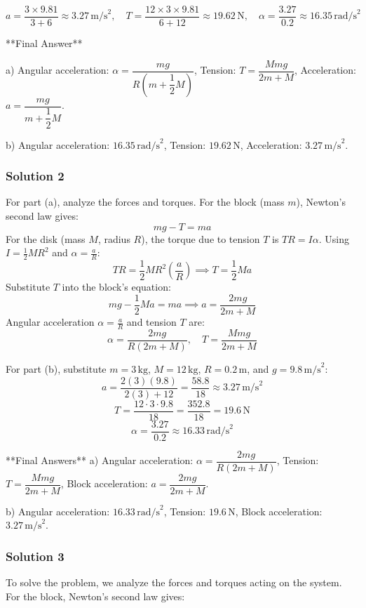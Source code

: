 \documentclass{article}
\begin{document}
\[
a = \frac{3 \times 9.81}{3 + 6} \approx 3.27\,\text{m/s}^2, \quad T = \frac{12 \times 3 \times 9.81}{6 + 12} \approx 19.62\,\text{N}, \quad \alpha = \frac{3.27}{0.2} \approx 16.35\,\text{rad/s}^2
\]

**Final Answer**

a) Angular acceleration: $\boxed{\alpha = \dfrac{mg}{R\left(m + \dfrac{1}{2}M\right)}}$,  
Tension: $\boxed{T = \dfrac{Mmg}{2m + M}}$,  
Acceleration: $\boxed{a = \dfrac{mg}{m + \dfrac{1}{2}M}}$.

b) Angular acceleration: $\boxed{16.35\,\text{rad/s}^2}$,  
Tension: $\boxed{19.62\,\text{N}}$,  
Acceleration: $\boxed{3.27\,\text{m/s}^2}$.

\subsubsection{Solution 2}

For part (a), analyze the forces and torques. For the block (mass $m$), Newton's second law gives:
\[
mg - T = ma
\]
For the disk (mass $M$, radius $R$), the torque due to tension $T$ is $TR = I\alpha$. Using $I = \frac{1}{2}MR^2$ and $\alpha = \frac{a}{R}$:
\[
TR = \frac{1}{2}MR^2 \left(\frac{a}{R}\right) \implies T = \frac{1}{2}Ma
\]
Substitute $T$ into the block's equation:
\[
mg - \frac{1}{2}Ma = ma \implies a = \frac{2mg}{2m + M}
\]
Angular acceleration $\alpha = \frac{a}{R}$ and tension $T$ are:
\[
\alpha = \frac{2mg}{R(2m + M)}, \quad T = \frac{Mmg}{2m + M}
\]

For part (b), substitute $m = 3\,\text{kg}$, $M = 12\,\text{kg}$, $R = 0.2\,\text{m}$, and $g = 9.8\,\text{m/s}^2$:
\[
a = \frac{2(3)(9.8)}{2(3) + 12} = \frac{58.8}{18} \approx 3.27\,\text{m/s}^2
\]
\[
T = \frac{12 \cdot 3 \cdot 9.8}{18} = \frac{352.8}{18} = 19.6\,\text{N}
\]
\[
\alpha = \frac{3.27}{0.2} \approx 16.33\,\text{rad/s}^2
\]

**Final Answers**  
a) Angular acceleration: $\boxed{\alpha = \dfrac{2mg}{R(2m + M)}}$,  
Tension: $\boxed{T = \dfrac{Mmg}{2m + M}}$,  
Block acceleration: $\boxed{a = \dfrac{2mg}{2m + M}}$.  

b) Angular acceleration: $\boxed{16.33\,\text{rad/s}^2}$,  
Tension: $\boxed{19.6\,\text{N}}$,  
Block acceleration: $\boxed{3.27\,\text{m/s}^2}$.

\subsubsection{Solution 3}
To solve the problem, we analyze the forces and torques acting on the system. For the block, Newton's second law gives:
\end{document}
